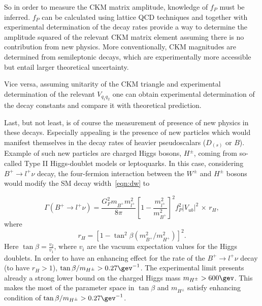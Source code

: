 So in order to measure the \gls{CKM} matrix amplitude, knowledge of $f_{P}$ must be inferred. $f_{P}$ can be calculated using lattice \gls{QCD} techniques and together with experimental determination of the decay rates provide a way to determine the amplitude squared of the relevant \gls{CKM} matrix element assuming there is no contribution from new physics. More conventionally, \gls{CKM} magnitudes are determined from semileptonic decays, which are experimentally 
more accessible but entail larger theoretical uncertainty.

Vice versa, assuming unitarity of the \gls{CKM} triangle and experimental determination of the relevant $V_{q_{1}q_{2}}$ one can obtain experimental determination of the decay constants and compare it with theoretical prediction.

Last, but not least, is of course the measurement of presence of new physics in these decays. Especially appealing is the presence of new particles which would manifest themselves in the decay rates of heavier pseudoscalars ($D_{(s)}$ or $B$). Example of such new particles are charged Higgs bosons, $H^{\pm}$, coming from so-called Type II Higgs-doublet models \cite{Hou:1992sy}\cite{Akeroyd:2003zr}\cite{Dobrescu:2008er} or leptoquarks\cite{Dobrescu:2008er}. In this case, considering $B^{+}\rightarrow l^{+}\nu$ decay, the four-fermion interaction between the $W^{\pm}$ and $H^{\pm}$ bosons would modify the \gls{SM} decay width~\autoref{eqn:dw} to

\begin{equation}
\Gamma(B^{+} \rightarrow {l^{+}} \nu)=  
        \frac{G_{F}^{2} m^{}_{B^{+}}  m_{l^{+}}^{2}}{8\pi} 
        \left[1 - \frac{m_{l^{+}}^{2}}{m_{B^{+}}^{2}}\right]^{2}  
	f_{P}^{2} |V_{ub}|^{2} \,\times\, r_H,
\end{equation}
where
\begin{equation}
	r_H=[1-\tan^2\beta(m^{2}_{B^{+}}/m^{2}_{H^{+}})]^2.
\end{equation}
Here $\tan\beta = \frac{v_{2}}{v_{1}}$, where $v_{i}$ are the vacuum expectation values for the Higgs doublets. In order to have an enhancing effect for the rate of the $B^{+}\rightarrow l^{+}\nu$ decay (to have $r_{H}>1$), $\tan\beta/m_{H^{\pm}}> 0.27 \gev^{-1}$. The experimental limit presents already a strong lower bound on the charged Higgs mass $m_{H^{\pm}}>600\gev$\cite{Arbey:2017gmh}. This makes the most of the parameter space in $\tan\beta$ and $m_{H^{\pm}}$ satisfy enhancing condition of $\tan\beta/m_{H^{\pm}}>0.27 \gev^{-1}$.

